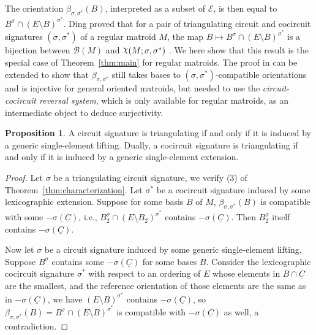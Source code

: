 \documentclass[12pt]{amsart}
\numberwithin{equation}{section}
\theoremstyle{definition}
\newtheorem{proposition}[theorem]{Proposition}
\newcommand{\Bcal}{{\mathcal B}}
\newcommand{\Ecal}{{\mathcal E}}
\DeclareRobustCommand{\rchi}{{\mathpalette\irchi\relax}}
\newcommand{\irchi}[2]{\raisebox{\depth}{$#1\chi$}}
\begin{document}
The orientation $\beta_{\sigma,\sigma^*}(B)$, interpreted as a subset of $\Ecal$, is then equal to $B^\sigma\cap (E\setminus B)^{\sigma^*}$. Ding proved that for a pair of triangulating circuit and cocircuit signatures $(\sigma,\sigma^*)$ of a regular matroid $M$, the map $B\mapsto B^\sigma\cap (E\setminus B)^{\sigma^*}$ is a bijection between $\Bcal(M)$ and $\rchi(M;\sigma,\sigma^*)$ \cite[Theorem~1.20]{Ding_GB2}.
We here show that this result is the special case of Theorem~\ref{thm:main} for regular matroids.  The proof in \cite{Ding_GB2} can be extended to show that $\beta_{\sigma,\sigma^*}$ still takes bases to $(\sigma,\sigma^*)$-compatible orientations and is injective for general oriented matroids, but \cite{Ding_GB2} needed to use the {\em circuit-cocircuit reversal system}, which is only available for regular matroids, as an intermediate object to deduce surjectivity. %

\begin{proposition} \label{prop:tri_eq_GSE}
A circuit signature is triangulating if and only if it is induced by a generic single-element lifting.
Dually, a cocircuit signature is triangulating if and only if it is induced by a generic single-element extension.
\end{proposition}

\begin{proof}
Let $\sigma$ be a triangulating circuit signature, we verify (3) of Theorem~\ref{thm:characterization}. Let $\sigma^*$ be a cocircuit signature induced by some lexicographic extension. Suppose for some basis $B$ of $M$, $\beta_{\sigma,\sigma^*}(B)$ is compatible with some $-\sigma(\underline{C})$, i.e., $B_2^\sigma\cap (E\setminus B_2)^{\sigma^*}$ contains $-\sigma(\underline{C})$.
Then $B_2^\sigma$ itself contains $-\sigma(\underline{C})$.

Now let $\sigma$ be a circuit signature induced by some generic single-element lifting.
Suppose $B^\sigma$ contains some $-\sigma(\underline{C})$ for some bases $B$.
Consider the lexicographic cocircuit signature $\sigma^*$ with respect to an ordering of $E$ whose elements in $B\cap \underline{C}$ are the smallest, and the reference orientation of those elements are the same as in $-\sigma(\underline{C})$, we have $(E\setminus B)^{\sigma^*}$ contains $-\sigma(\underline{C})$, so $\beta_{\sigma,\sigma^*}(B)=B^\sigma\cap (E\setminus B)^{\sigma^*}$ is compatible with $-\sigma(\underline{C})$ as well, a contradiction.
\end{proof}
\end{document}
